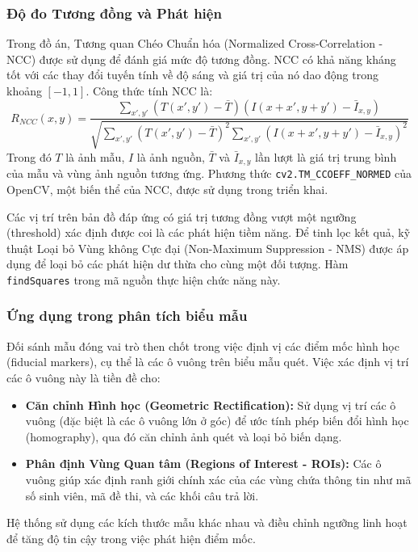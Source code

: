 \subsubsection{Độ đo Tương đồng và Phát hiện}
Trong đồ án, Tương quan Chéo Chuẩn hóa (Normalized Cross-Correlation - NCC) được sử dụng để đánh giá mức độ tương đồng. NCC có khả năng kháng tốt với các thay đổi tuyến tính về độ sáng và giá trị của nó dao động trong khoảng $[-1, 1]$. Công thức tính NCC là:
\begin{equation}
R_{NCC}(x,y) = \frac{\sum_{x',y'} (T(x',y') - \bar{T})(I(x+x',y+y') - \bar{I}_{x,y})}{\sqrt{\sum_{x',y'} (T(x',y') - \bar{T})^2 \sum_{x',y'} (I(x+x',y+y') - \bar{I}_{x,y})^2}}
\label{eq:ncc_concise}
\end{equation}
Trong đó $T$ là ảnh mẫu, $I$ là ảnh nguồn, $\bar{T}$ và $\bar{I}_{x,y}$ lần lượt là giá trị trung bình của mẫu và vùng ảnh nguồn tương ứng. Phương thức \texttt{cv2.TM\_CCOEFF\_NORMED} của OpenCV, một biến thể của NCC, được sử dụng trong triển khai.

Các vị trí trên bản đồ đáp ứng có giá trị tương đồng vượt một ngưỡng (threshold) xác định được coi là các phát hiện tiềm năng. Để tinh lọc kết quả, kỹ thuật Loại bỏ Vùng không Cực đại (Non-Maximum Suppression - NMS) được áp dụng để loại bỏ các phát hiện dư thừa cho cùng một đối tượng. Hàm \texttt{findSquares} trong mã nguồn thực hiện chức năng này.

\subsubsection{Ứng dụng trong phân tích biểu mẫu}
Đối sánh mẫu đóng vai trò then chốt trong việc định vị các điểm mốc hình học (fiducial markers), cụ thể là các ô vuông trên biểu mẫu quét. Việc xác định vị trí các ô vuông này là tiền đề cho:
\begin{itemize}
    \item \textbf{Căn chỉnh Hình học (Geometric Rectification):} Sử dụng vị trí các ô vuông (đặc biệt là các ô vuông lớn ở góc) để ước tính phép biến đổi hình học (homography), qua đó căn chỉnh ảnh quét và loại bỏ biến dạng.
    \item \textbf{Phân định Vùng Quan tâm (Regions of Interest - ROIs):} Các ô vuông giúp xác định ranh giới chính xác của các vùng chứa thông tin như mã số sinh viên, mã đề thi, và các khối câu trả lời.
\end{itemize}

Hệ thống sử dụng các kích thước mẫu khác nhau và điều chỉnh ngưỡng linh hoạt để tăng độ tin cậy trong việc phát hiện điểm mốc.

